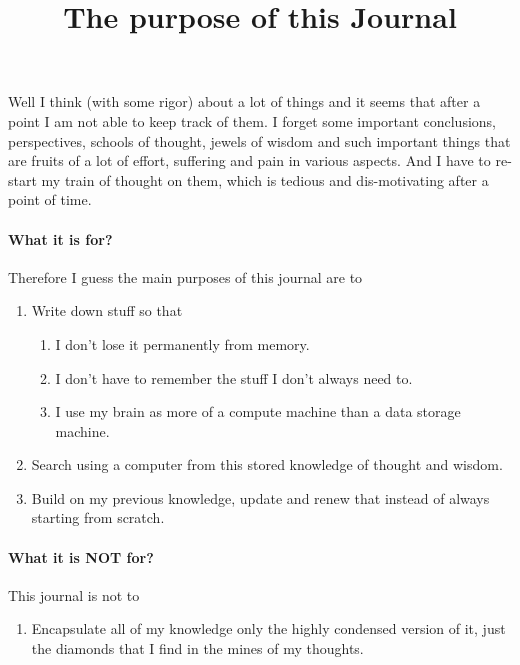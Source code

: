 \documentclass[12pt]{article}
\title{The purpose of this Journal}
\author{}
\begin{document}
\maketitle


Well I think (with some rigor) about a lot of things and it seems that after a point I am not able to keep track of them.
I forget some important conclusions, perspectives, schools of thought, jewels of wisdom and such important things that are fruits of a lot of effort, suffering and pain in various aspects.
And I have to re-start my train of thought on them, which is tedious and dis-motivating after a point of time.

\paragraph{What it is for?}
Therefore I guess the main purposes of this journal are to
\begin{enumerate}
  \item Write down stuff so that
    \begin{enumerate}
      \item I don't lose it permanently from memory.
      \item I don't have to remember the stuff I don't always need to.
      \item I use my brain as more of a compute machine than a data storage machine.
    \end{enumerate}
  \item Search using a computer from this stored knowledge of thought and wisdom.
  \item Build on my previous knowledge, update and renew that instead of always starting from scratch.
\end{enumerate}

\paragraph{What it is NOT for?}
This journal is not to
\begin{enumerate}
  \item Encapsulate all of my knowledge only the highly condensed version of it, just the diamonds that I find in the mines of my thoughts.
\end{enumerate}
\end{document}
